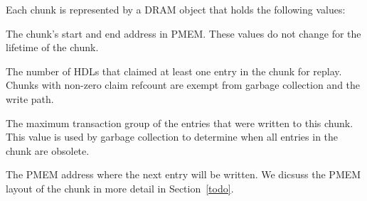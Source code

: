 \documentclass[12pt,a4paper,twoside]{book}
\begin{document}
Each chunk is represented by a DRAM object that holds the following values:
\begin{description}[noitemsep]
    \item[PMEM location] The chunk's start and end address in PMEM. These values do not change for the lifetime of the chunk.
    \item[Claim refcount] The number of HDLs that claimed at least one entry in the chunk for replay.
        Chunks with non-zero claim refcount are exempt from garbage collection and the write path.
    \item[Max txg] The maximum transaction group of the entries that were written to this chunk.
        This value is used by garbage collection to determine when all entries in the chunk are obsolete.
    \item[Write position] The PMEM address where the next entry will be written.
        We dicsuss the PMEM layout of the chunk in more detail in Section~\ref{todo}.
\end{description}
\end{document}
